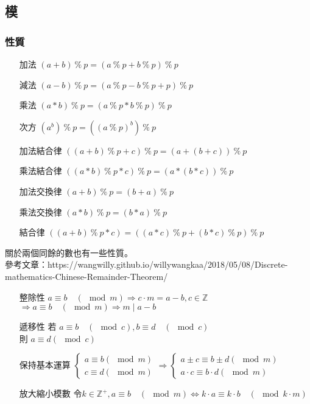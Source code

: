\subsection{模}
\subsubsection{性質}
\begin{enumerate}
\item [加法] $(a+b)\ \%\ p= (a\ \%\ p +b\ \%\ p )\ \%\ p $
\item [減法] $(a-b)\ \%\ p= (a\ \%\ p -b\ \%\ p +p)\ \%\ p $
\item [乘法] $(a*b)\ \%\ p= (a\ \%\ p *b\ \%\ p )\ \%\ p $
\item [次方] $(a^b)\ \%\ p= ((a\ \%\ p )^b)\ \%\ p $
\item [加法結合律] $((a+b)\ \%\ p+c)\ \%\ p = (a+(b+c))\ \%\ p $
\item [乘法結合律] $((a*b)\ \%\ p*c)\ \%\ p = (a*(b*c))\ \%\ p $
\item [加法交換律] $(a+b)\ \%\ p=(b+a)\ \%\ p$
\item [乘法交換律] $(a*b)\ \%\ p=(b*a)\ \%\ p$
\item [結合律] $((a+b)\ \%\ p*c)= ((a*c)\ \%\ p +(b*c)\ \%\ p )\ \%\ p $
\end{enumerate}
關於兩個同餘的數也有一些性質。\\
參考文章：https://wangwilly.github.io/willywangkaa/2018/05/08/Discrete-mathematics-Chinese-Remainder-Theorem/
\begin{enumerate}
\item [整除性] $a\equiv b \quad (\mod m) \Rightarrow c \cdot m  = a - b , c \in \mathbb{Z}$\\ $\Rightarrow a \equiv b\quad ( \mod m ) \Rightarrow m \; | \; a-b$
\item [遞移性] 若 $a \equiv b \quad (\mod c) , b \equiv d \quad (\mod c)$\\ 則 $a \equiv d (\mod c)$
\item [保持基本運算] $\left \{ \begin{matrix} a \equiv b (\mod m)\\ c \equiv d (\mod m)\end{matrix}\right. \Rightarrow \left\{\begin{matrix}a \pm c \equiv b \pm d (\mod m)\\ a \cdot c \equiv b \cdot d (\mod m)\end{matrix}\right.$
\item [放大縮小模數] 令$k \in \mathbb{Z}^+ , a \equiv b \quad (\mod m) \Leftrightarrow k \cdot a \equiv k \cdot b \quad (\mod k \cdot m)$
\end{enumerate}
